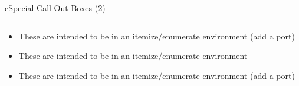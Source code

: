 \begin{myslide}{c}{Special Call-Out Boxes (2)}

\begin{columns}

\begin{column}{1\textwidth}

\begin{itemize}

\itembox
\begin{myremark}
\lipsum[1][1]
\end{myremark}

\item These are intended to be in an itemize/enumerate environment (add a port)

\item These are intended to be in an itemize/enumerate environment

\itembox
\begin{myimportant}
\lipsum[1][1-2]
\end{myimportant}

\itembox
\begin{myfuture}
\lipsum[1][3-6]
\end{myfuture}

\item These are intended to be in an itemize/enumerate environment (add a port)

\itembox
\begin{myquestion}
\lipsum[1][2-3]
\end{myquestion}

\end{itemize}

\end{column}

\end{columns}

\end{myslide}

